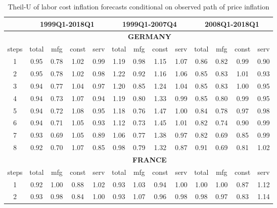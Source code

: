 \documentclass[11pt]{article}
\begin{document}
\begin{appendices}
\begin{table}[htbp]
\small
  \centering
  \caption{Theil-U of labor cost inflation forecasts conditional on observed path of price inflation}
    \begin{tabular}{c|cccc|cccc|cccc}
    \midrule
    \multicolumn{1}{r}{} & \multicolumn{4}{c}{\textbf{1999Q1-2018Q1}} & \multicolumn{4}{c}{\textbf{1999Q1-2007Q4}} & \multicolumn{4}{c}{\textbf{2008Q1-2018Q1}} \\
    \midrule
    \multicolumn{1}{c}{} & \multicolumn{12}{c}{\textbf{GERMANY}} \\
    \midrule
    steps & total & mfg   & const & serv  & total & mfg   & const & serv  & total & mfg   & const & serv \\
    \midrule
    1     & 0.95  & 0.78  & 1.02  & 0.99  & 1.19  & 0.98  & 1.15  & 1.07  & 0.86  & 0.82  & 0.99  & 0.90 \\
    2     & 0.95  & 0.78  & 1.02  & 0.98  & 1.22  & 0.92  & 1.16  & 1.06  & 0.85  & 0.83  & 1.01  & 0.93 \\
    3     & 0.94  & 0.77  & 1.04  & 0.97  & 1.20  & 0.85  & 1.24  & 1.04  & 0.85  & 0.83  & 1.00  & 0.95 \\
    4     & 0.94  & 0.73  & 1.07  & 0.94  & 1.19  & 0.80  & 1.33  & 0.99  & 0.85  & 0.80  & 0.99  & 0.95 \\
    5     & 0.94  & 0.72  & 1.08  & 0.95  & 1.18  & 0.76  & 1.47  & 1.00  & 0.84  & 0.78  & 0.97  & 0.98 \\
    6     & 0.94  & 0.71  & 1.05  & 0.93  & 1.12  & 0.73  & 1.45  & 1.01  & 0.82  & 0.74  & 0.90  & 0.99 \\
    7     & 0.93  & 0.69  & 1.05  & 0.89  & 1.06  & 0.77  & 1.38  & 0.97  & 0.82  & 0.69  & 0.85  & 0.99 \\
    8     & 0.92  & 0.70  & 1.07  & 0.85  & 0.98  & 0.79  & 1.32  & 0.87  & 0.91  & 0.69  & 0.81  & 1.02 \\
    \midrule
    \multicolumn{1}{c}{} & \multicolumn{12}{c}{\textbf{FRANCE}} \\
    \midrule
    steps & total & mfg   & const & serv  & total & mfg   & const & serv  & total & mfg   & const & serv \\
    \midrule
    1     & 0.92  & 1.00  & 0.88  & 1.02  & 0.93  & 1.03  & 0.94  & 1.00  & 1.00  & 1.00  & 0.87  & 1.12 \\
    2     & 0.93  & 0.98  & 0.84  & 1.00  & 0.93  & 1.07  & 0.96  & 0.98  & 0.98  & 0.97  & 0.83  & 1.14 \\

\end{tabular}
\end{table}
\end{appendices}
\end{document}
